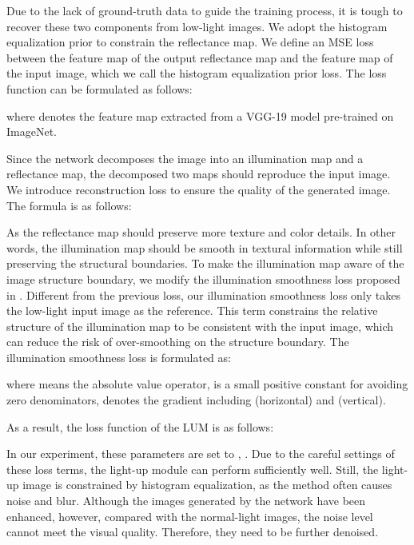 \documentclass[journal]{IEEEtran}
\begin{document}
Due to the lack of ground-truth data to guide the training process, it is tough to recover these two components from low-light images. We adopt the histogram equalization prior to constrain the reflectance map. We define an MSE loss between the feature map of the output reflectance map and the feature map of the input image, which we call the histogram equalization prior loss. The loss function can be formulated as follows:

\noindent where  denotes the feature map extracted from a VGG-19 model pre-trained on ImageNet.

Since the network decomposes the image into an illumination map and a reflectance map, the decomposed two maps should reproduce the input image. We introduce reconstruction loss to ensure the quality of the generated image. The formula is as follows:


As the reflectance map should preserve more texture and color details. In other words, the illumination map should be smooth in textural information while still preserving the structural boundaries. To make the illumination map aware of the image structure boundary, we modify the illumination smoothness loss proposed in \cite{zhang2021beyond}. Different from the previous loss, our illumination smoothness loss only takes the low-light input image as the reference. This term constrains the relative structure of the illumination map to be consistent with the input image, which can reduce the risk of over-smoothing on the structure boundary. The illumination smoothness loss is formulated as:

\noindent where  means the absolute value operator,  is a small positive constant for avoiding zero denominators,  denotes the gradient including  (horizontal) and  (vertical).

As a result, the loss function of the LUM is as follows:




In our experiment, these parameters are set to , . Due to the careful settings of these loss terms, the light-up module can perform sufficiently well. Still, the light-up image is constrained by histogram equalization, as the method often causes noise and blur. Although the images generated by the network have been enhanced, however, compared with the normal-light images, the noise level cannot meet the visual quality. Therefore, they need to be further denoised.
\end{document}
